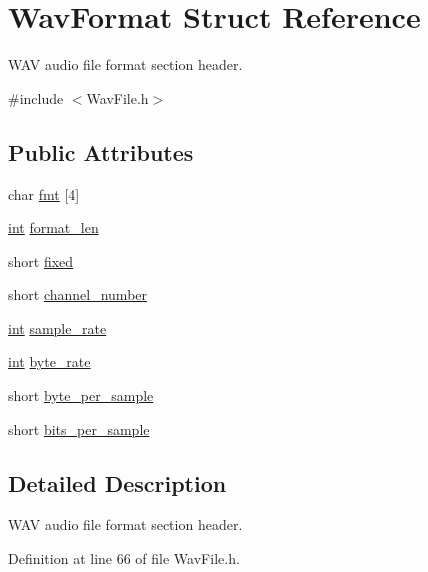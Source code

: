 \hypertarget{struct_wav_format}{}\section{Wav\+Format Struct Reference}
\label{struct_wav_format}


W\+AV audio file \textquotesingle{}format\textquotesingle{} section header.  




{\ttfamily \#include $<$Wav\+File.\+h$>$}

\subsection*{Public Attributes}
\begin{DoxyCompactItemize}
\item 
char \hyperlink{struct_wav_format_a1594d23ce05ea2ce07d97d07e4f38832}{fmt} \mbox{[}4\mbox{]}
\item 
\hyperlink{xmltok_8h_a5a0d4a5641ce434f1d23533f2b2e6653}{int} \hyperlink{struct_wav_format_a6b24ac462dd0d59b5f5e3dc297afc8bd}{format\+\_\+len}
\item 
short \hyperlink{struct_wav_format_a77ecdf86ba6abc9661c1e61486b664db}{fixed}
\item 
short \hyperlink{struct_wav_format_a646d8221763d5e1c43a7811a5789296d}{channel\+\_\+number}
\item 
\hyperlink{xmltok_8h_a5a0d4a5641ce434f1d23533f2b2e6653}{int} \hyperlink{struct_wav_format_a29fa19c2baf150fbdd70d10d13390c1e}{sample\+\_\+rate}
\item 
\hyperlink{xmltok_8h_a5a0d4a5641ce434f1d23533f2b2e6653}{int} \hyperlink{struct_wav_format_a9059b9e3a6c4bef59b9557f801040f92}{byte\+\_\+rate}
\item 
short \hyperlink{struct_wav_format_a431018caa2aa6b501014bdac4d40c8b7}{byte\+\_\+per\+\_\+sample}
\item 
short \hyperlink{struct_wav_format_a52b9a67e1620c5385e0b413601aeb55b}{bits\+\_\+per\+\_\+sample}
\end{DoxyCompactItemize}


\subsection{Detailed Description}
W\+AV audio file \textquotesingle{}format\textquotesingle{} section header. 

Definition at line 66 of file Wav\+File.\+h.



